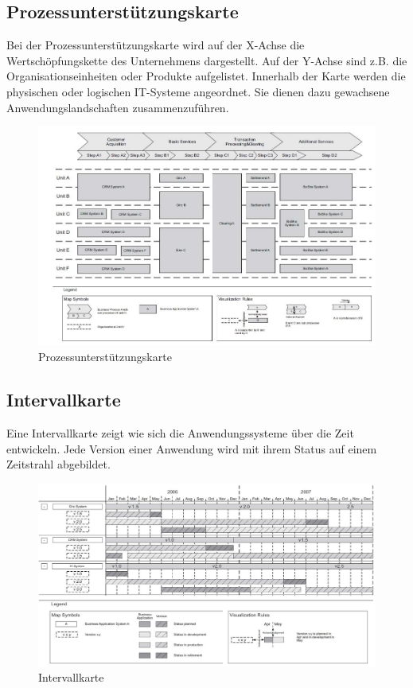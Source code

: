 \subsection{Prozessunterstützungskarte}

Bei der Prozessunterstützungskarte wird auf der X-Achse die Wertschöpfungskette des Unternehmens dargestellt. Auf der Y-Achse sind z.B. die Organisationseinheiten oder Produkte aufgelistet. Innerhalb der Karte werden die physischen oder logischen IT-Systeme angeordnet. Sie dienen dazu gewachsene Anwendungslandschaften zusammenzuführen.

\begin{figure}[h!]
\centering
\includegraphics[width=\linewidth]{fig/prozessunterstuetzungskarte}
\caption{Prozessunterstützungskarte}
\label{fig:prozessunterstuetzungskarte}
\end{figure}

\newpage

\subsection{Intervallkarte}

Eine Intervallkarte zeigt wie sich die Anwendungssysteme über die Zeit entwickeln. Jede Version einer Anwendung wird mit ihrem Status auf einem Zeitstrahl abgebildet.

\begin{figure}[h!]
\centering
\includegraphics[width=\linewidth]{fig/intervallkarte}
\caption{Intervallkarte}
\label{fig:intervallkarte}
\end{figure}

